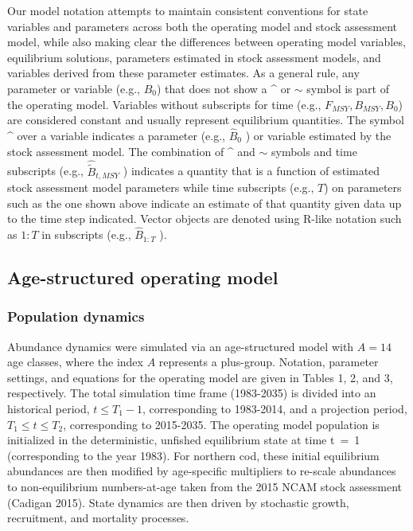\documentclass[12pt,]{article}
\begin{document}
Our model notation attempts to maintain consistent conventions for state
variables and parameters across both the operating model and stock
assessment model, while also making clear the differences between
operating model variables, equilibrium solutions, parameters estimated
in stock assessment models, and variables derived from these parameter
estimates. As a general rule, any parameter or variable (e.g., \(B_0\))
that does not show a \^{} or \(\sim\) symbol is part of the operating
model. Variables without subscripts for time (e.g.,
\(F_{MSY}, B_{MSY}, B_0\)) are considered constant and usually represent
equilibrium quantities. The symbol \^{} over a variable indicates a
parameter (e.g., \(\hat{B}_0\) ) or variable estimated by the stock
assessment model. The combination of \^{} and \(\sim\) symbols and time
subscripts (e.g., \(\hat{\tilde{B}}_{t,MSY}\) ) indicates a quantity
that is a function of estimated stock assessment model parameters while
time subscripts (e.g., \(T\)) on parameters such as the one shown above
indicate an estimate of that quantity given data up to the time step
indicated. Vector objects are denoted using R-like notation such as
\(1:T\) in subscripts (e.g., \(\hat{B}_{1:T}\) ).

\subsection{Age-structured operating
model}\label{age-structured-operating-model}

\subsubsection{Population dynamics}\label{population-dynamics}

Abundance dynamics were simulated via an age-structured model with
\(A = 14\) age classes, where the index \(A\) represents a plus-group.
Notation, parameter settings, and equations for the operating model are
given in Tables 1, 2, and 3, respectively. The total simulation time
frame (1983-2035) is divided into an historical period,
\(t \leq T_1 - 1\), corresponding to 1983-2014, and a projection period,
\(T_1 \leq t \leq T_2\), corresponding to 2015-2035. The operating model
population is initialized in the deterministic, unfished equilibrium
state at time t~=~1 (corresponding to the year 1983). For northern cod,
these initial equilibrium abundances are then modified by age-specific
multipliers to re-scale abundances to non-equilibrium numbers-at-age
taken from the 2015 NCAM stock assessment (Cadigan 2015). State dynamics
are then driven by stochastic growth, recruitment, and mortality
processes.
\end{document}
